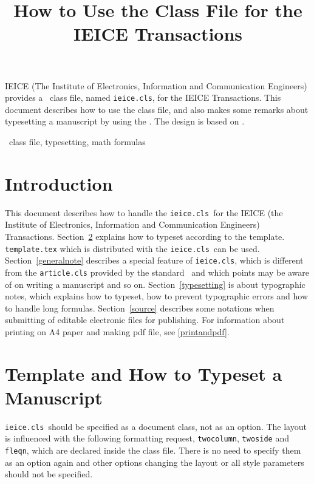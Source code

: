 \documentclass[paper]{ieice}
\title[How to Use the Class File]
      {How to Use the Class File for the IEICE Transactions}
\def\ClassFile{\texttt{ieice.cls}}
\begin{document}
\maketitle

\begin{summary}
IEICE (The Institute of Electronics, Information and Communication Engineers) 
provides a \LaTeXe\ class file, named \ClassFile, 
for the IEICE Transactions. This document describes how to use 
the class file, and also makes some remarks about typesetting 
a manuscript by using the \LaTeXe. The design is based on \LaTeXe.
\end{summary}
\begin{keywords}
\LaTeXe\ class file, typesetting, math formulas
\end{keywords}

\section{Introduction}\label{intro}

This document describes how to handle the \ClassFile\ 
for the IEICE (the Institute of Electronics, Information 
and Communication Engineers) Transactions. 
Section~\ref{usage} explains how to typeset according to the template. 
\texttt{template.tex} which is distributed with the \ClassFile\ can be used. 
Section~\ref{generalnote} describes a special feature of \ClassFile, 
which is different from the \texttt{article.cls} provided 
by the standard \LaTeXe\ and which points may be aware of 
on writing a manuscript and so on. Section~\ref{typesetting} is 
about typographic notes, 
which explains how to typeset, how to prevent typographic errors 
and how to handle long formulas. 
Section~\ref{source} describes some notations 
when submitting of editable electronic files for publishing. 
For information about printing on A4 paper and making pdf file, 
see \ref{printandpdf}. 

\section{Template and How to Typeset a Manuscript}
\label{usage}

\ClassFile\ should be specified as a document class, not as an option.
The layout is influenced with the following formatting request, 
\texttt{twocolumn}, \texttt{twoside} and \texttt{fleqn}, 
which are declared inside the class file. 
There is no need to specify them as an option again 
and other options changing the layout or all style parameters 
should not be specified. 
\end{document}
